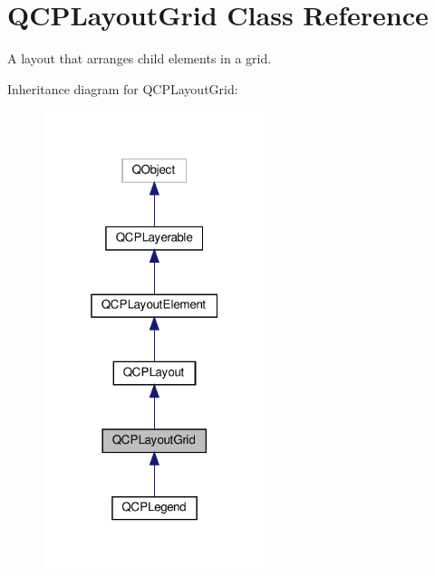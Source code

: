 \hypertarget{classQCPLayoutGrid}{}\section{Q\+C\+P\+Layout\+Grid Class Reference}
\label{classQCPLayoutGrid}


A layout that arranges child elements in a grid.  




Inheritance diagram for Q\+C\+P\+Layout\+Grid\+:\nopagebreak
\begin{figure}[H]
\begin{center}
\leavevmode
\includegraphics[width=184pt]{classQCPLayoutGrid__inherit__graph}
\end{center}
\end{figure}


